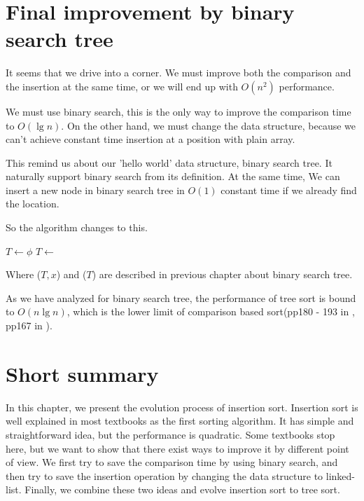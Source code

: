 \documentclass{article}
\begin{document}

\section{Final improvement by binary search tree}

It seems that we drive into a corner. We must improve both the comparison
and the insertion at the same time, or we will end up with $O(n^2)$ performance.

We must use binary search, this is the only way to improve the comparison
time to $O(\lg n)$. On the other hand, we must change the data structure,
because we can't achieve constant time insertion at a position with
plain array.

This remind us about our 'hello world' data structure, binary search tree.
It naturally support binary search from its definition. At the same time,
We can insert a new node in binary search tree in $O(1)$ constant time
if we already find the location.

So the algorithm changes to this.

\begin{algorithmic}
  \State $T \gets \phi$
    \State $T \gets $ 
  \EndFor
  \State \Return {}
\EndFunction
\end{algorithmic}

Where ($T, x$) and ($T$) are described in
previous chapter about binary search tree.

As we have analyzed for binary search tree, the performance of tree sort
is bound to $O(n \lg n)$, which is the lower limit of comparison based
sort(pp180 - 193 in \cite{Knuth-V3}, pp167 in \cite{CLRS}).

\section{Short summary}
In this chapter, we present the evolution process of insertion sort. Insertion
sort is well explained in most textbooks as the first sorting algorithm.
It has simple and straightforward idea, but the performance is quadratic.
Some textbooks stop here, but we want to show that there exist ways to improve
it by different point of view. We first try to save the comparison time
by using binary search, and then try to save the insertion operation by
changing the data structure to linked-list. Finally, we combine these
two ideas and evolve insertion sort to tree sort.
\end{document}
